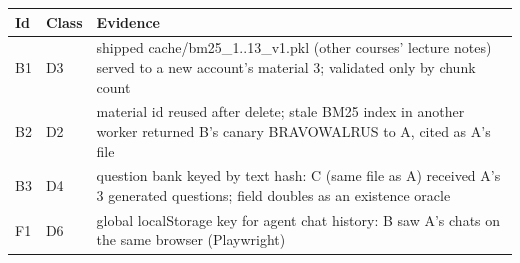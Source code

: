 \begin{tabular}{llp{5.6cm}}
\toprule
Id & Class & Evidence \\
\midrule
B1 & D3 & shipped cache/bm25\_{1..13}\_v1.pkl (other courses' lecture notes) served to a new account's material 3; validated only by chunk count \\
B2 & D2 & material id reused after delete; stale BM25 index in another worker returned B's canary BRAVOWALRUS to A, cited as A's file \\
B3 & D4 & question bank keyed by text hash: C (same file as A) received A's 3 generated questions; field doubles as an existence oracle \\
F1 & D6 & global localStorage key for agent chat history: B saw A's chats on the same browser (Playwright) \\
\bottomrule
\end{tabular}

